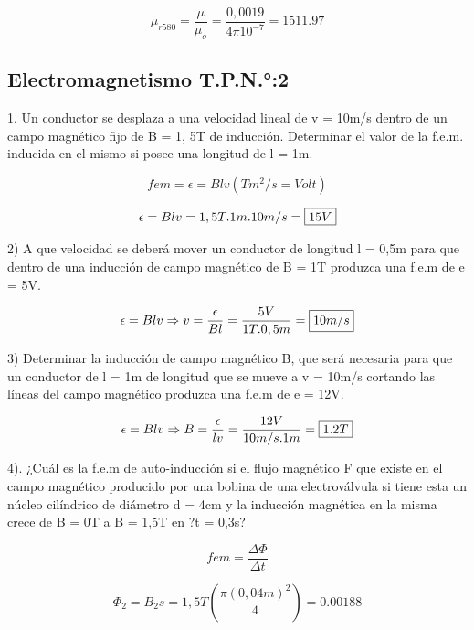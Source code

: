\begin{equation}
\mu_{r580}=\frac{\mu}{\mu_o}= \frac{0,0019}{4\pi 10^{-7}}=
1511.97
\end{equation}


\subsection{Electromagnetismo T.P.N.°:2}

1. Un conductor se desplaza a una velocidad lineal de v = 10m/s dentro de un campo magnético
fijo de B = 1, 5T de inducción. Determinar el valor de la f.e.m. inducida en el mismo si posee una longitud de l = 1m.

\begin{equation}
fem=\epsilon= B l v (Tm^2/s=Volt)
\end{equation}

\begin{equation}
\epsilon= B l v =1,5T . 1m .10m/s=\fbox{$15V$}
\end{equation}

2) A que velocidad se deberá mover un conductor de longitud l = 0,5m para que dentro de una
inducción de campo magnético de B = 1T produzca una f.e.m de e = 5V.

\begin{equation}
\epsilon= B l v \Rightarrow v=\frac{\epsilon}{Bl}=\frac{5V}{1T.0,5m}=\fbox{$10m/s$}
\end{equation}

3) Determinar la inducción de campo magnético B, que será necesaria para que un conductor
de l = 1m de longitud que se mueve a v = 10m/s cortando las líneas del campo magnético
produzca una f.e.m de e = 12V.

\begin{equation}
\epsilon= B l v \Rightarrow B=\frac{\epsilon}{lv}=\frac{12V}{10m/s.1m}=\fbox{$1.2T$}
\end{equation}

4). ¿Cuál es la f.e.m de auto-inducción si el flujo magnético F que existe en el campo magnético
producido por una bobina de una electroválvula si tiene esta un núcleo cilíndrico de diámetro
d = 4cm y la inducción magnética en la misma crece de B = 0T a B = 1,5T en ?t = 0,3s?

\begin{equation}
fem= \frac{\Delta\Phi}{\Delta t}
\end{equation}

\begin{equation}
\Phi_2=B_2s=1,5T (\frac{\pi (0,04m)^2}{4})=0.00188
\end{equation}

